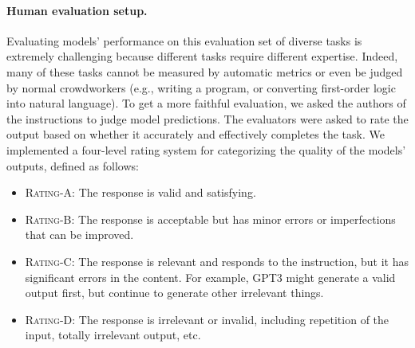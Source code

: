 \documentclass[11pt]{article}
\newcommand{\nascomment}[1]{\textcolor{blue}{\textbf{[#1 -- \textsc{nas}]}}}
\begin{document}

\paragraph{Human evaluation setup.}
Evaluating models' performance on this evaluation set of diverse tasks is extremely challenging because different tasks require different expertise. Indeed, many of these tasks cannot be measured by automatic metrics or even be judged by normal crowdworkers (e.g., writing a program, or converting first-order logic into natural language). To get a more faithful evaluation, we asked the authors of the instructions to judge model predictions. The evaluators were asked to rate the output based on whether it accurately and effectively completes the task. We implemented a four-level rating system for categorizing the quality of the models' outputs, defined as follows:

\begin{itemize}[noitemsep, leftmargin=*]
    \item \textsc{Rating-A:} The response is valid and satisfying.
    \item \textsc{Rating-B:} The response is acceptable but has minor errors or imperfections that can be improved.
    \item \textsc{Rating-C:} The response is relevant and responds to the instruction, but it has significant errors in the content. For example, GPT3 might generate a valid output first, but continue to generate other irrelevant things.
    \item \textsc{Rating-D:} The response is irrelevant or invalid, including repetition of the input, totally irrelevant output, etc.
\end{itemize}
\end{document}
